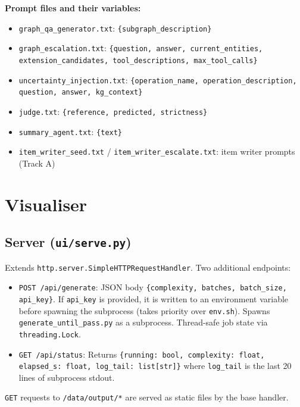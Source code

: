 \documentclass[11pt,a4paper]{article}
\begin{document}
\textbf{Prompt files and their variables:}
\begin{itemize}[leftmargin=*,noitemsep]
  \item \texttt{graph\_qa\_generator.txt}: \texttt{\{subgraph\_description\}}
  \item \texttt{graph\_escalation.txt}: \texttt{\{question, answer, current\_entities, extension\_candidates, tool\_descriptions, max\_tool\_calls\}}
  \item \texttt{uncertainty\_injection.txt}: \texttt{\{operation\_name, operation\_description, question, answer, kg\_context\}}
  \item \texttt{judge.txt}: \texttt{\{reference, predicted, strictness\}}
  \item \texttt{summary\_agent.txt}: \texttt{\{text\}}
  \item \texttt{item\_writer\_seed.txt} / \texttt{item\_writer\_escalate.txt}: item writer prompts (Track A)
\end{itemize}

\section{Visualiser}
\label{sec:ui}

\subsection{Server (\texttt{ui/serve.py})}

Extends \texttt{http.server.SimpleHTTPRequestHandler}. Two additional endpoints:

\begin{itemize}[leftmargin=*,noitemsep]
  \item \texttt{POST /api/generate}: JSON body \texttt{\{complexity, batches, batch\_size, api\_key\}}. If \texttt{api\_key} is provided, it is written to an environment variable before spawning the subprocess (takes priority over \texttt{env.sh}). Spawns \texttt{generate\_until\_pass.py} as a subprocess. Thread-safe job state via \texttt{threading.Lock}.
  \item \texttt{GET /api/status}: Returns \texttt{\{running: bool, complexity: float, elapsed\_s: float, log\_tail: list[str]\}} where \texttt{log\_tail} is the last 20 lines of subprocess stdout.
\end{itemize}

\texttt{GET} requests to \texttt{/data/output/*} are served as static files by the base handler.
\end{document}
